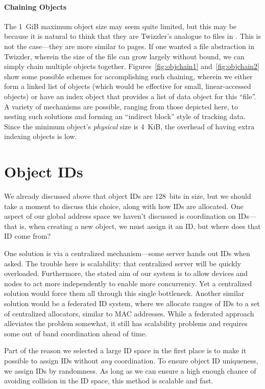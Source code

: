 \paragraph{Chaining Objects}
The 1~GiB maximum object size may seem quite limited, but this may be because it is natural to think that they are
Twizzler's analogue to files in \unix. This is not the case---they are more similar to pages. If one wanted a
file abstraction in Twizzler, wherein the size of the file can grow largely without bound, we can simply chain multiple
objects together. Figures~\ref{fig:objchain1} and~\ref{fig:objchain2} show some possible schemes for accomplishing such
chaining, wherein we either form a linked list of objects (which would be effective for small, linear-accessed objects)
or have an index object that provides a list of data object for this ``file''. A variety of mechanisms are possible,
ranging from those depicted here, to nesting such solutions and forming an ``indirect block'' style of tracking data.
Since the minimum object's \emph{physical} size is 4~KiB, the overhead of having extra indexing objects is low.



\section{Object IDs}

We already discussed above that object IDs are 128~bits in size, but we should take a moment to discuss this choice,
along with how IDs are allocated. One aspect of our global address space we haven't discussed is coordination on IDs---that is,
when creating a new object, we must assign it an ID, but where does that ID come from?

One solution is via a centralized mechanism---some server hands out IDs when asked. The trouble here is scalability:
that centralized server will be quickly overloaded. Furthermore, the stated aim of our system is to allow devices and
nodes to act more independently to enable more concurrency. Yet a centralized solution would force them all through this
single bottleneck. Another similar solution would be a federated ID system, where we allocate ranges of IDs to a set of
centralized allocators, similar to MAC addresses. While a federated approach alleviates the problem somewhat, it still
has scalability problems and requires some out of band coordination ahead of time.

Part of the reason we selected a large ID space in the first place is to make it possible to assign IDs without
\emph{any} coordination. To ensure object ID uniqueness, we assign IDs by randomness. As long as we can ensure a high
enough chance of avoiding collision in the ID space, this method is scalable and fast.

